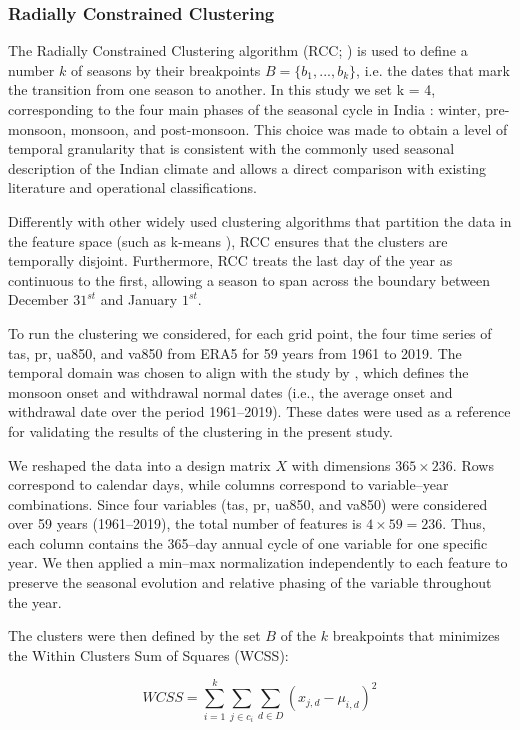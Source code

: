 \subsubsection{Radially Constrained Clustering}
The Radially Constrained Clustering algorithm (RCC; \citet{cannon_defining_2005}) is used to define a number $k$ of seasons by their breakpoints $B=\{b_1, ... ,b_k\}$, i.e. the dates that mark the transition from one season to another.
In this study we set k = 4, corresponding to the four main phases of the  seasonal cycle in India : winter, pre-monsoon, monsoon, and post-monsoon. This choice was made to obtain a level of temporal granularity that is consistent with the commonly used seasonal description of the Indian climate and allows a direct comparison with existing literature and operational classifications. 

Differently with other widely used clustering algorithms that partition the data in the feature space (such as k-means \citep{lloyd_least_1982}), RCC ensures that the clusters are temporally disjoint. 
Furthermore, RCC treats the last day of the year as continuous to the first, allowing a season to span across the boundary between December $31^{st}$ and January $1^{st}$.

To run the clustering we considered, for each grid point, the four time series of tas, pr, ua850, and va850 from ERA5 for 59 years from 1961 to 2019. The temporal domain was chosen to align with the study by \citet{pai_normal_2020}, which defines the monsoon onset and withdrawal normal dates (i.e., the average onset and withdrawal date over the period 1961--2019). These dates were used as a reference for validating the results of the clustering in the present study. 

We reshaped the data into a design matrix $X$ with dimensions $365 \times 236$. Rows correspond to calendar days, while columns correspond to variable–year combinations. Since four variables (tas, pr, ua850, and va850) were considered over 59 years (1961--2019), the total number of features is $4 \times 59 = 236$. Thus, each column contains the 365--day annual cycle of one variable for one specific year. We then applied a min–max normalization independently to each feature to preserve the seasonal evolution and relative phasing of the variable throughout the year.

The clusters were then defined by the set $B$ of the $k$ breakpoints that minimizes the Within Clusters Sum of Squares (WCSS):

\begin{linenomath*}
    \begin{equation}
        WCSS = \sum_{i=1}^k \sum_{j \in c_i} \sum_{d \in D} \left( x_{j,d} - \mu_{i,d} \right)^2
    \end{equation}
\end{linenomath*}

